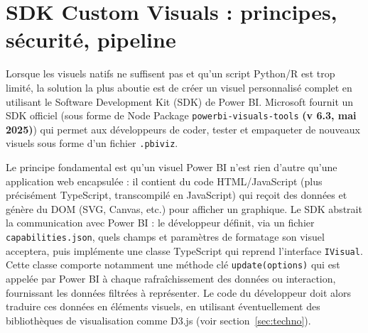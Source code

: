 \section{SDK Custom Visuals : principes, sécurité, pipeline}
\label{sec:sdk}

Lorsque les visuels natifs ne suffisent pas et qu’un script Python/R est trop limité, la solution la plus aboutie est de créer un visuel personnalisé complet en utilisant le Software Development Kit (SDK) de Power BI. Microsoft fournit un SDK officiel (sous forme de Node Package \texttt{powerbi-visuals-tools} \textbf{(v 6.3, mai 2025)}) qui permet aux développeurs de coder, tester et empaqueter de nouveaux visuels sous forme d’un fichier \texttt{.pbiviz}\parencite{MicrosoftSDKNpm2025}.

Le principe fondamental est qu’un visuel Power BI n’est rien d’autre qu’une application web encapsulée : il contient du code HTML/JavaScript (plus précisément TypeScript, transcompilé en JavaScript) qui reçoit des données et génère du DOM (SVG, Canvas, etc.) pour afficher un graphique. Le SDK abstrait la communication avec Power BI : le développeur définit, via un fichier \texttt{capabilities.json}, quels champs et paramètres de formatage son visuel acceptera, puis implémente une classe TypeScript qui reprend l’interface \texttt{IVisual}. Cette classe comporte notamment une méthode clé \texttt{update(options)} qui est appelée par Power BI à chaque rafraîchissement des données ou interaction, fournissant les données filtrées à représenter. Le code du développeur doit alors traduire ces données en éléments visuels, en utilisant éventuellement des bibliothèques de visualisation comme D3.js (voir section~\ref{sec:techno}).

